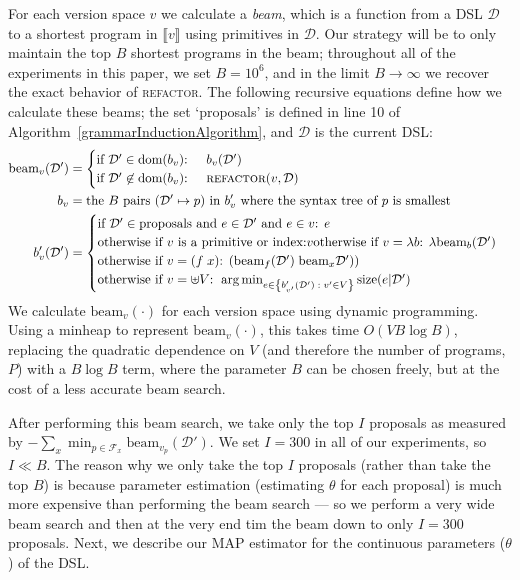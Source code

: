 \documentclass{article}
\newcommand{\denotation}[1]{{\llbracket #1 \rrbracket}}
\DeclareMathOperator*{\argmin}{arg\,min} %
\begin{document}
For each version space $v$ we calculate a \emph{beam}, which is a
function from a DSL $\mathcal{D}$ to a shortest program in
$\denotation{v}$ using primitives in $\mathcal{D}$.  Our strategy will
be to only maintain the top $B$ shortest programs in the beam;
throughout all of the experiments in this paper, we set $B = 10^6$,
and in the limit $B\to\infty$ we recover the exact behavior of \textsc{refactor}.
The following recursive equations
define how we calculate these beams;
the set `proposals' is defined in line 10 of Algorithm~\ref{grammarInductionAlgorithm},
and $\mathcal{D}$ is the current DSL:
\begin{align*}
  \text{beam}_v(\mathcal{D}')& = \begin{cases}
    \text{if }\mathcal{D}'\in \text{dom}(b_v)\text{: }&b_v(\mathcal{D}')\\
    \text{if }\mathcal{D}'\not\in \text{dom}(b_v)\text{: }&\textsc{refactor}(v,\mathcal{D})
  \end{cases}\\
  b_v& = \text{the $B$ pairs $(\mathcal{D}'\mapsto p)$ in $b_v'$ where the syntax tree of $p$ is smallest}\\
  b_v'(\mathcal{D}')& = \begin{cases}
    \text{if $\mathcal{D}'\in \text{proposals}$ and $e\in \mathcal{D}'$ and  $e\in v$: }e\\
    \text{otherwise if $v$ is a primitive or index:} v
    \text{otherwise if $v = \lambda b$: } \lambda \text{beam}_b(\mathcal{D}')\\
    \text{otherwise if $v = (f\;x)$: } (\text{beam}_f(\mathcal{D}')\;\text{beam}_x\mathcal{D}'))\\
    \text{otherwise if $v = \uplus V$: } \argmin_{e\in \left\{b'_{v'}(\mathcal{D}')\;:\;v'\in V \right\}}\text{size}(e|\mathcal{D}')
    \end{cases}
  \end{align*}
We calculate $\text{beam}_v(\cdot )$ for each version space using
dynamic programming.  Using a minheap to represent
$\text{beam}_v(\cdot )$, this takes time $O(VB\log B)$, replacing the
quadratic dependence on $V$ (and therefore the number of programs,
$P$) with a $B\log B$ term, where the parameter $B$ can be chosen
freely, but at the cost of a less accurate beam search.

After performing this beam search,
we take only the top $I$ proposals as measured by $-\sum_x\min_{p\in \mathcal{F}_x}\text{beam}_{v_p}(\mathcal{D}')$.
We set $I = 300$ in all of our experiments,
so $I \ll B$.
The reason why we
only take the top $I$ proposals (rather than take the top $B$) is because
parameter estimation (estimating $\theta$ for each proposal) is much more expensive than
performing the beam search ---
so we perform a very wide beam search and then at the very end
tim the beam down to
only $I = 300$ proposals.
Next,
we describe our MAP estimator for the continuous parameters ($\theta$) of the DSL.
\end{document}
